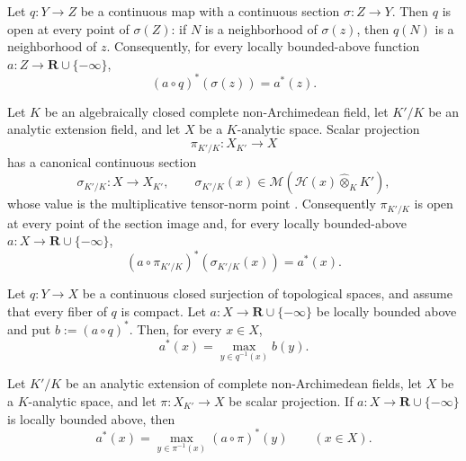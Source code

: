 
\begin{lemma}
\label{lem:p031-continuous-section-pointwise-openness}
Let $q:Y\to Z$ be a continuous map with a continuous section
$\sigma:Z\to Y$.  Then $q$ is open at every point of $\sigma(Z)$: if $N$
is a neighborhood of $\sigma(z)$, then $q(N)$ is a neighborhood of $z$.
Consequently, for every locally bounded-above function
$a:Z\to\mathbf R\cup\{-\infty\}$,
\begin{equation}
\label{eq:p031-continuous-section-usc-regularization}
                  (a\circ q)^*(\sigma(z))=a^*(z).
\end{equation}
\end{lemma}

\begin{corollary}
\label{cor:p031-canonical-scalar-section-anchor}
Let $K$ be an algebraically closed complete non-Archimedean field, let
$K'/K$ be an analytic extension field, and let $X$ be a $K$-analytic space.
Scalar projection
\[
                    \pi_{K'/K}:X_{K'}\longrightarrow X
\]
has a canonical continuous section
\[
 \sigma_{K'/K}:X\longrightarrow X_{K'},
 \qquad
 \sigma_{K'/K}(x)
  \in\mathcal M\!\left(\mathcal H(x)\widehat\otimes_KK'\right),
\]
whose value is the multiplicative tensor-norm point
\cite[Definition~3.2, Corollary~3.7, Remark~3.13, and
Corollary~3.14]{Poi13Angelic}.  Consequently $\pi_{K'/K}$ is open at every
point of the section image and, for every locally bounded-above
$a:X\to\mathbf R\cup\{-\infty\}$,
\begin{equation}
\label{eq:p031-canonical-scalar-section-regularization}
 (a\circ\pi_{K'/K})^*(\sigma_{K'/K}(x))=a^*(x).
\end{equation}
\end{corollary}

\begin{lemma}
\label{lem:p031-perfect-pullback-usc}
Let $q:Y\to X$ be a continuous closed surjection of topological spaces,
and assume that every fiber of $q$ is compact.  Let
$a:X\to\mathbf R\cup\{-\infty\}$ be locally bounded above and put
$b:=(a\circ q)^*$.  Then, for every $x\in X$,
\begin{equation}
\label{eq:p031-perfect-pullback-usc}
             a^*(x)=\max_{y\in q^{-1}(x)} b(y).
\end{equation}
\end{lemma}

\begin{corollary}
\label{cor:p031-scalar-fiber-maximum}
Let $K'/K$ be an analytic extension of complete non-Archimedean fields,
let $X$ be a $K$-analytic space, and let
$\pi:X_{K'}\to X$ be scalar projection.  If
$a:X\to\mathbf R\cup\{-\infty\}$ is locally bounded above, then
\begin{equation}
\label{eq:p031-scalar-fiber-maximum}
 a^*(x)
   =\max_{y\in\pi^{-1}(x)}(a\circ\pi)^*(y)
       \qquad(x\in X).
\end{equation}
\end{corollary}
